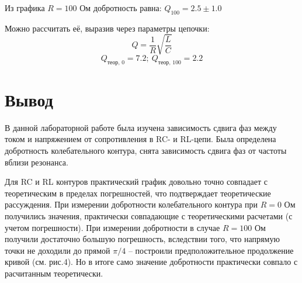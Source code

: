 \documentclass[a4paper, 12pt]{article}
\begin{document}
Из графика $R = 100$ Ом добротность равна:
$Q_{100}=2.5 \pm1.0$

Можно рассчитать её, выразив через параметры цепочки:
$$Q = \frac{1}{R} \sqrt{\frac{L}{C}}$$
$$Q_{\text{теор, 0}} = 7.2;~Q_{\text{теор, 100}} = 2.2$$

\section{Вывод}

В данной лабораторной работе была изучена зависимость сдвига фаз между током и напряжением от сопротивления в RC- и RL-цепи. Была определена добротность колебательного контура, снята зависимость сдвига фаз от частоты вблизи резонанса. 

Для RC и RL контуров практический график довольно точно совпадает с теоретическим в пределах погрешностей, что подтверждает теоретические рассуждения. При измерении добротности колебательного контура при $R=0$ Ом получились значения, практически совпадающие с теоретическими расчетами (с учетом погрешности). При измерении добротности в случае $R=100$ Ом получили достаточно большую погрешность, вследствии того, что напрямую точки не доходили до прямой $\pi/4$ -- построили предположительное продолжение кривой (см. рис.4). Но в итоге само значение добротности практически совпало с расчитанным теоретически.
\end{document}
